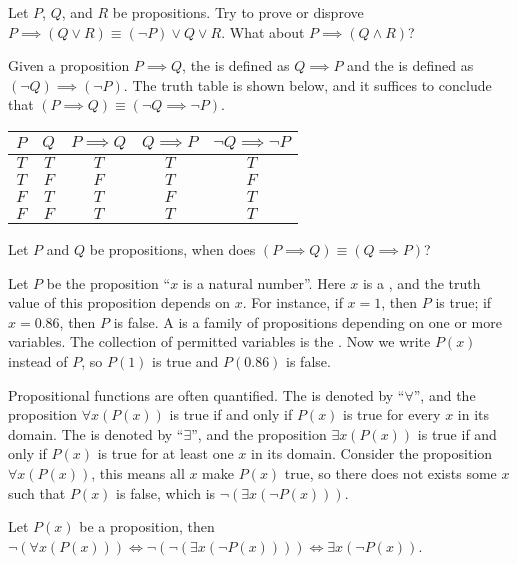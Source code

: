 \documentclass[10pt]{article}
\begin{document}
\begin{problem}
    Let $P$, $Q$, and $R$ be propositions. Try to prove or disprove $P\implies(Q\vee R)\equiv(\neg P)\vee Q\vee R$. What about $P\implies(Q\wedge R)$?
\end{problem}
\par
Given a proposition $P\implies Q$, the  is defined as $Q\implies P$ and the  is defined as $(\neg Q)\implies(\neg P)$. The truth table is shown below, and it suffices to conclude that $(P\implies Q)\equiv(\neg Q\implies\neg P)$.
\begin{center}
    \begin{tabular}{cc|ccc}
        $P$ & $Q$ & $P\implies Q$ & $Q\implies P$ & $\neg Q\implies\neg P$ \\
        \hline
        $T$ & $T$ & $T$ & $T$ & $T$ \\
        $T$ & $F$ & $F$ & $T$ & $F$ \\
        $F$ & $T$ & $T$ & $F$ & $T$ \\
        $F$ & $F$ & $T$ & $T$ & $T$
    \end{tabular}
\end{center}
\begin{problem}
    Let $P$ and $Q$ be propositions, when does $(P\implies Q)\equiv(Q\implies P)$?
\end{problem}
\par
Let $P$ be the proposition ``$x$ is a natural number''. Here $x$ is a , and the truth value of this proposition depends on $x$. For instance, if $x=1$, then $P$ is true; if $x=0.86$, then $P$ is false. A  is a family of propositions depending on one or more variables. The collection of permitted variables is the . Now we write $P(x)$ instead of $P$, so $P(1)$ is true and $P(0.86)$ is false.
\par
Propositional functions are often quantified. The  is denoted by ``$\forall$'', and the proposition $\forall x(P(x))$ is true if and only if $P(x)$ is true for every $x$ in its domain. The  is denoted by ``$\exists$'', and the proposition $\exists x(P(x))$ is true if and only if $P(x)$ is true for at least one $x$ in its domain. Consider the proposition $\forall x(P(x))$, this means all $x$ make $P(x)$ true, so there does not exists some $x$ such that $P(x)$ is false, which is $\neg(\exists x(\neg P(x)))$.
\begin{example}
    Let $P(x)$ be a proposition, then $\neg(\forall x(P(x)))\iff\neg(\neg(\exists x(\neg P(x))))\iff\exists x(\neg P(x))$. 
\end{example}
\end{document}
